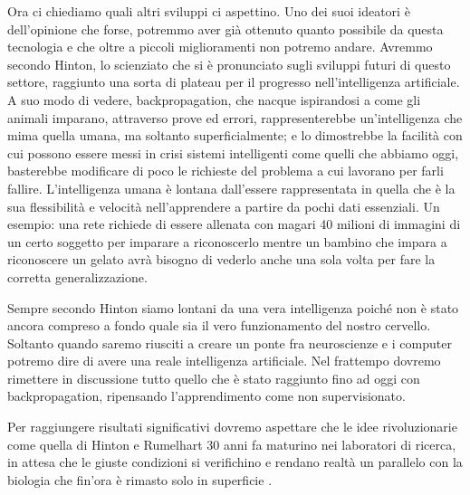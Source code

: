 \documentclass [12pt ,a4paper,openany]{book}
\begin{document}
Ora ci chiediamo quali altri sviluppi ci aspettino. Uno dei suoi ideatori è dell'opinione che forse, potremmo aver già ottenuto quanto possibile da questa tecnologia e che oltre a piccoli miglioramenti non potremo andare. Avremmo secondo Hinton, lo scienziato che si è pronunciato sugli sviluppi futuri di questo settore, raggiunto una sorta di plateau per il progresso nell'intelligenza artificiale. A suo modo di vedere, backpropagation, che nacque ispirandosi a come gli animali imparano, attraverso prove ed errori, rappresenterebbe un'intelligenza che mima quella umana, ma soltanto superficialmente; e lo dimostrebbe la facilità con cui possono essere messi in crisi sistemi intelligenti come quelli che abbiamo oggi, basterebbe modificare di poco le richieste del problema a cui lavorano per farli fallire. L'intelligenza umana è lontana dall'essere rappresentata in quella che è la sua flessibilità e velocità nell'apprendere a partire da pochi dati essenziali. Un esempio: una rete richiede di essere allenata con magari 40 milioni di immagini di un certo soggetto per imparare a riconoscerlo mentre un bambino che impara a riconoscere un gelato avrà bisogno di vederlo anche una sola volta per fare la corretta generalizzazione. 

Sempre secondo Hinton siamo lontani da una vera intelligenza poiché non è stato ancora compreso a fondo quale sia il vero funzionamento del nostro cervello. Soltanto quando saremo riusciti a creare un ponte fra neuroscienze e i computer potremo dire di avere una reale intelligenza artificiale. Nel frattempo dovremo rimettere in discussione tutto quello che è stato raggiunto fino ad oggi con backpropagation, ripensando l'apprendimento come non supervisionato.

Per raggiungere risultati significativi dovremo aspettare che le idee rivoluzionarie come quella di Hinton e Rumelhart 30 anni fa maturino nei laboratori di ricerca, in attesa che le giuste condizioni si verifichino e rendano realtà un parallelo con la biologia che fin'ora è rimasto solo in superficie \cite{mit-ai}. 



\end{document}
